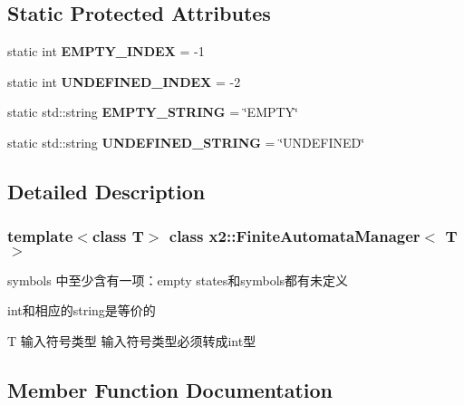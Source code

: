 \subsection*{Static Protected Attributes}
\begin{DoxyCompactItemize}
\item 
\mbox{\label{classx2_1_1_finite_automata_manager_a5f2f1897280db4ff57f6bcb21c002f2c}} 
static int {\bfseries E\+M\+P\+T\+Y\+\_\+\+I\+N\+D\+EX} = -\/1
\item 
\mbox{\label{classx2_1_1_finite_automata_manager_a27e9b72349b7e2442a847f4aad1f244b}} 
static int {\bfseries U\+N\+D\+E\+F\+I\+N\+E\+D\+\_\+\+I\+N\+D\+EX} = -\/2
\item 
\mbox{\label{classx2_1_1_finite_automata_manager_a51dce54aff6821b61d467eb89a5e7763}} 
static std\+::string {\bfseries E\+M\+P\+T\+Y\+\_\+\+S\+T\+R\+I\+NG} = \char`\"{}E\+M\+P\+TY\char`\"{}
\item 
\mbox{\label{classx2_1_1_finite_automata_manager_a55dd0263995adf15ed5f1818be8c6fee}} 
static std\+::string {\bfseries U\+N\+D\+E\+F\+I\+N\+E\+D\+\_\+\+S\+T\+R\+I\+NG} = \char`\"{}U\+N\+D\+E\+F\+I\+N\+ED\char`\"{}
\end{DoxyCompactItemize}


\subsection{Detailed Description}
\subsubsection*{template$<$class T$>$\newline
class x2\+::\+Finite\+Automata\+Manager$<$ T $>$}

symbols 中至少含有一项：empty states和symbols都有未定义

int和相应的string是等价的

T 输入符号类型 输入符号类型必须转成int型 

\subsection{Member Function Documentation}
\mbox{\label{classx2_1_1_finite_automata_manager_a86be4353e0fca67243a2a397bb289966}} 
